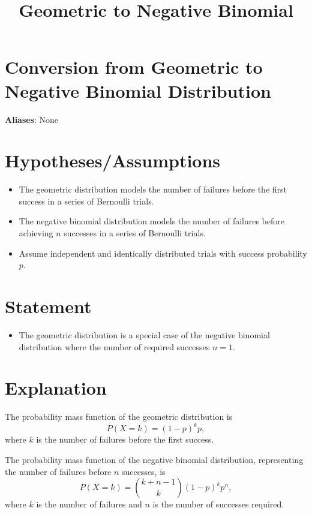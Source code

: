 \documentclass{article}
\title{Geometric to Negative Binomial}
\author{}
\date{}
\begin{document}
\maketitle

\section*{Conversion from Geometric to Negative Binomial Distribution}
\textbf{Aliases}: None

\section*{Hypotheses/Assumptions}
\begin{itemize}
    \item The geometric distribution models the number of failures before the first success in a series of Bernoulli trials.
    \item The negative binomial distribution models the number of failures before achieving \( n \) successes in a series of Bernoulli trials.
    \item Assume independent and identically distributed trials with success probability \( p \).
\end{itemize}

\section*{Statement}
\begin{itemize}
    \item The geometric distribution is a special case of the negative binomial distribution where the number of required successes \( n = 1 \).
\end{itemize}

\section*{Explanation}
The probability mass function of the geometric distribution is
\[
P(X = k) = (1 - p)^k p,
\]
where \( k \) is the number of failures before the first success.

The probability mass function of the negative binomial distribution, representing the number of failures before \( n \) successes, is
\[
P(X = k) = \binom{k + n - 1}{k} (1 - p)^k p^n,
\]
where \( k \) is the number of failures and \( n \) is the number of successes required.
\end{document}
